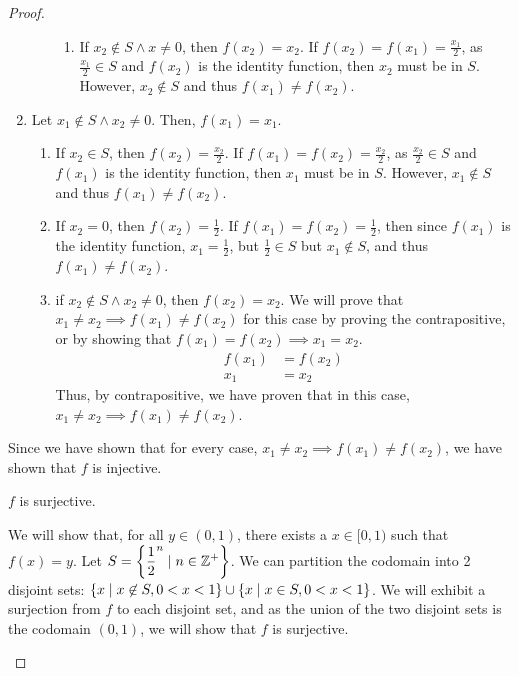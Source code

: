 \documentclass[11pt]{scrartcl}
\theoremstyle{dotlessP}
\theoremstyle{dotlessN}
\DeclarePairedDelimiter\set{\{}{\}}
\newcommand{\unite}{\cup}
\newcommand{\ints}{\mathbb{Z}}
\begin{document}
\begin{proof}
\begin{subproof}
\begin{enumerate}
\begin{enumerate}
\begin{enumerate}
			\item If $x_2 \not \in S \land x \neq 0$, then $f(x_2) = x_2$. If  $f(x_2) = f(x_1) = \displaystyle\frac{x_1}{2}$, as $\displaystyle\frac{x_1}{2} \in S$ and $f(x_2)$ is the identity function, then $x_2$ must be in $S$. However, $x_2 \not \in S$ and thus $f(x_1) \neq f(x_2)$.
		\end{enumerate}
\end{enumerate}
\item Let $x_1 \not \in S \land x_2 \neq 0$. Then, $f(x_1) = x_1$.
	\begin{enumerate}
		\item If $x_2 \in S$, then $f(x_2) = \displaystyle \frac{x_2}{2}$.
			If  $f(x_1) = f(x_2) = \displaystyle\frac{x_2}{2}$, as $\displaystyle\frac{x_2}{2} \in S$ and $f(x_1)$ is the identity function, then $x_1$ must be in $S$. However, $x_1 \not \in S$ and thus $f(x_1) \neq f(x_2)$.
\item If $x_2 = 0$, then $f(x_2) = \displaystyle\frac{1}{2}$. If $f(x_1) = f(x_2) = \displaystyle\frac{1}{2}$, then since $f(x_1)$ is the identity function, $x_1 = \displaystyle\frac{1}{2}$, but $\displaystyle\frac{1}{2} \in S$ but $x_1 \not\in S$, and thus $f(x_1) \neq f(x_2)$.
\item if $x_2 \not\in S \land x_2 \neq 0$, then $f(x_2) = x_2$. We will prove that $x_1 \neq x_2 \implies f(x_1) \neq f(x_2)$ for this case by proving the contrapositive, or by showing that $f(x_1) = f(x_2) \implies x_1 = x_2$.
	\begin{align*}
		f(x_1) &= f(x_2) \\
		x_1 &= x_2
	\end{align*}
	Thus, by contrapositive, we have proven that in this case, $x_1 \neq x_2 \implies f(x_1) \neq f(x_2)$.
	\end{enumerate}
		\end{enumerate}
		Since we have shown that for every case, $x_1 \neq x_2 \implies f(x_1) \neq f(x_2)$, we have shown that $f$ is injective.
	\end{subproof}	
	\begin{claim*}
		$f$ is surjective.
	\end{claim*}
	\begin{subproof}
		[Subproof]
		We will show that, for all $y \in (0,1)$, there exists a $x \in [0,1)$ such that $f(x) = y$. Let $S = \set*{\displaystyle\frac{1}{2}^n \mid n \in \ints^+}$. We can partition the codomain into 2 disjoint sets: $\set*{x \mid x \not \in S, 0 < x < 1} \unite \set*{x \mid x \in S, 0 < x < 1}$. We will exhibit a surjection from $f$ to each disjoint set, and as the union of the two disjoint sets is the codomain  $(0,1)$, we will show that $f$ is surjective.

\end{subproof}
\end{proof}
\end{document}

